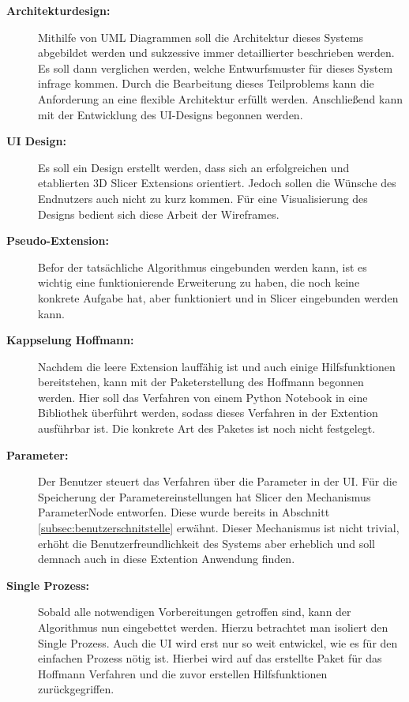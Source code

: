 \begin{description}
	\item[\textbf{Architekturdesign:}] Mithilfe von UML Diagrammen soll die Architektur
		dieses Systems abgebildet werden und sukzessive immer detaillierter beschrieben
		werden. Es soll dann verglichen werden, welche Entwurfsmuster für dieses System
		infrage kommen. Durch die Bearbeitung dieses Teilproblems kann die
		Anforderung an eine flexible Architektur erfüllt werden. Anschließend kann mit
		der Entwicklung des UI-Designs begonnen werden.

	\item[\textbf{UI Design:}] Es soll ein Design erstellt werden, dass sich an
		erfolgreichen und etablierten 3D Slicer Extensions orientiert. Jedoch sollen
		die Wünsche des Endnutzers auch nicht zu kurz kommen. Für eine
		Visualisierung des Designs bedient sich diese Arbeit der Wireframes.

	\item[\textbf{Pseudo-Extension:}] Befor der tatsächliche Algorithmus eingebunden
		werden kann, ist es wichtig eine funktionierende Erweiterung zu haben, die noch
		keine konkrete Aufgabe hat, aber funktioniert und in Slicer eingebunden
		werden kann.

	\item[\textbf{Kappselung Hoffmann:}] Nachdem die leere Extension lauffähig ist
		und auch einige Hilfsfunktionen bereitstehen, kann mit der Paketerstellung
		des Hoffmann begonnen werden. Hier soll das Verfahren von einem Python Notebook
		in eine Bibliothek überführt werden, sodass dieses Verfahren in der
		Extention ausführbar ist. Die konkrete Art des Paketes ist noch nicht festgelegt.

	\item[\textbf{Parameter:}] Der Benutzer steuert das Verfahren über die Parameter
		in der UI. Für die Speicherung der Parametereinstellungen hat Slicer den
		Mechanismus ParameterNode entworfen. Diese wurde bereits in Abschnitt \ref{subsec:benutzerschnitstelle}
		erwähnt. Dieser Mechanismus ist nicht trivial, erhöht die Benutzerfreundlichkeit
		des Systems aber erheblich und soll demnach auch in diese Extention Anwendung
		finden.

	\item[\textbf{Single Prozess:}] Sobald alle notwendigen Vorbereitungen getroffen
		sind, kann der Algorithmus nun eingebettet werden. Hierzu betrachtet man isoliert
		den Single Prozess. Auch die UI wird erst nur so weit entwickel, wie es für den
		einfachen Prozess nötig ist. Hierbei wird auf das erstellte Paket für das
		Hoffmann Verfahren und die zuvor erstellen Hilfsfunktionen zurückgegriffen.


\end{description}
